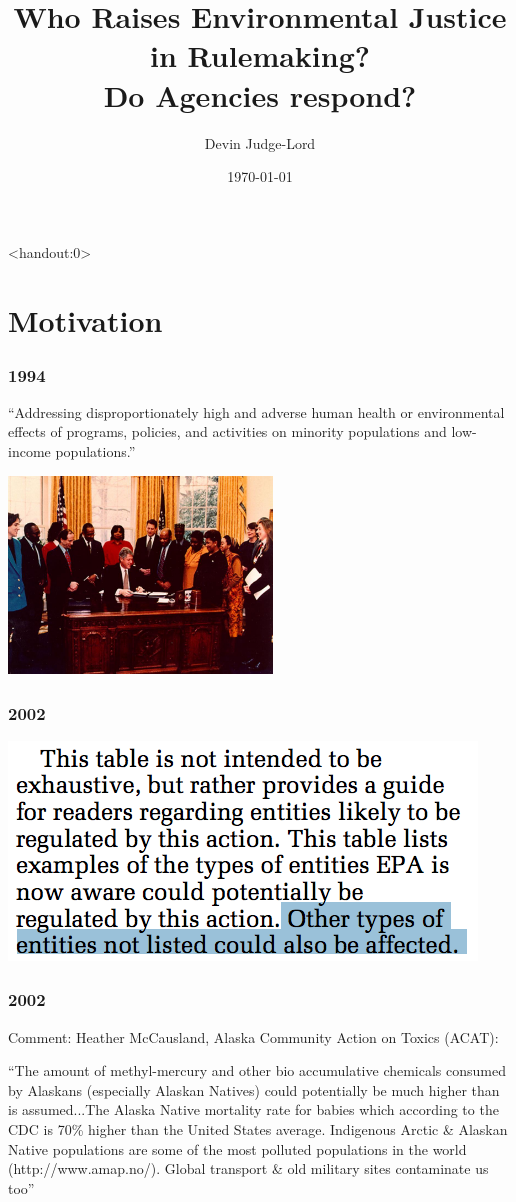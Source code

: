 \documentclass[10pt]{beamer}
\title{Who Raises Environmental Justice in Rulemaking?\\Do Agencies respond?}
\author[Devin Judge-Lord]{Devin Judge-Lord}
\institute{University of Wisconsin}
\date{\today}
\begin{document}
\begin{frame}<handout:0>
  \titlepage
\end{frame}

\section{Motivation}

\begin{frame}
\frametitle{1994}

``Addressing disproportionately high and adverse human health or environmental effects of programs, policies, and activities on minority populations and low-income populations.''

\bigskip
\centering

\includegraphics[width = 7cm]{clinton-ej.jpg}
\end{frame}


\begin{frame}
\frametitle{2002}
\centering
\includegraphics[]{ej_murcury_nprm.png}
\end{frame}

\begin{frame}
\frametitle{2002}

Comment: Heather McCausland, Alaska Community Action on Toxics (ACAT):

\bigskip

``The amount of methyl-mercury and other bio accumulative chemicals consumed by Alaskans (especially Alaskan Natives) could potentially be much higher than is assumed...The Alaska Native mortality rate for babies which according to the CDC is 70\% higher than the United States average. Indigenous Arctic \& Alaskan Native populations are some of the most polluted populations in the world (http://www.amap.no/). Global transport \& old military sites contaminate us too''
\end{frame}
\end{document}
